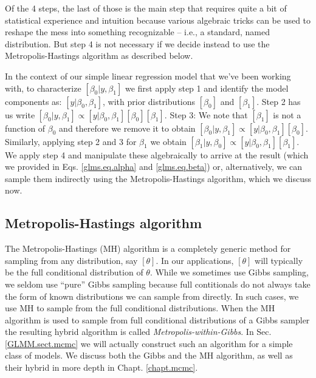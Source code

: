 
Of the 4 steps, the last of those is the main step that requires quite
a bit of statistical experience and intuition because various
algebraic tricks can be used to reshape the mess into something
recognizable -- i.e., a standard, named distribution. But step 4 is not
necessary if we decide instead to use the Metropolis-Hastings algorithm
as described below.

In the context of our simple linear regression model that we've been 
working with, to characterize $[\beta_0|y,\beta_1]$ we first apply step 1
and identify the model components as: $[y|\beta_0, \beta_1]$, with
prior distributions $[\beta_0]$
and $[\beta_1]$. Step 2 has us write $[\beta_0|y,\beta_1] \propto
[y|\beta_0,\beta_1][\beta_0][\beta_1]$.  Step 3: We note that $[\beta_1]$ is not a
function of $\beta_0$ and therefore we remove it to obtain $[\beta_0|y,\beta_1]
\propto [y|\beta_0,\beta_1][\beta_0]$. Similarly, applying step 2 and 3 for $\beta_1$ we obtain $[\beta_1|y,\beta_0]
\propto [y|\beta_0,\beta_1][\beta_1]$. We apply step 4 and manipulate
these algebraically to arrive at the result (which we provided in
Eqs. \ref{glms.eq.alpha} and \ref{glms.eq.beta}) or, alternatively, we can
sample them indirectly using the Metropolis-Hastings algorithm, which we 
discuss now.


\subsection{Metropolis-Hastings algorithm}

The Metropolis-Hastings (MH) algorithm is a completely generic method for
sampling from any distribution, say $[\theta]$. In our applications,
$[\theta]$ will typically be the full conditional distribution of
$\theta$.
While we sometimes use Gibbs sampling, we seldom
use ``pure'' Gibbs sampling because full contitionals do not always take the form of known distributions we can sample from directly. In such cases, we use MH to sample from the full conditional distributions.
When the MH algorithm is used to sample from  full
conditional distributions of a Gibbs sampler the resulting hybrid algorithm is
called
 {\it Metropolis-within-Gibbs}.
In Sec. \ref{GLMM.sect.mcmc} we will
actually construct such an algorithm for a simple class of models. We discuss both the Gibbs and the MH algorithm, as well as their hybrid in more depth in Chapt. \ref{chapt.mcmc}.

